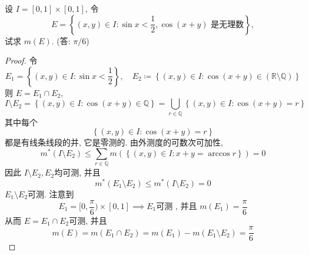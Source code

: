 \documentclass[../main.tex]{subfiles}
\begin{document}
\begin{exercise}{}{}
设 $I=[0,1]\times[0,1]$, 令
\[
E = \left\{ (x,y) \in I: \sin x < \frac{1}{2}, \cos(x+y) \text{ 是无理数} \right\},
\]
试求 $m(E)$. (答: $\pi/6$)

\end{exercise}
\begin{proof}
    令 \[
    E_1= \left\{ \left( x,y \right)\in I: \sin x< \frac{1 }{2 }   \right\} ,\quad E_2\coloneqq \left\{ \left( x,y \right)\in I:\cos \left( x+ y \right)\in \left( \mathbb{R} \setminus \mathbb{Q}  \right)    \right\}
    \]则 \(  E= E_1\cap E_2  \),  \[
    I\setminus E_2= \left\{ \left( x,y \right)\in I : \cos \left( x+ y \right)\in \mathbb{Q}    \right\}= \bigcup _{r \in \mathbb{Q} }\left\{ \left( x,y \right)  \in I:\cos \left( x+ y \right)= r \right\}
    \]其中每个\[
    \left\{ \left( x,y \right)\in I: \cos \left( x+ y \right)= r   \right\}
    \]都是有线条线段的并, 它是零测的. 由外测度的可数次可加性,  \[
    m^{*}\left( I\setminus E_2 \right)\le \sum _{r \in \mathbb{Q} }m\left( \left\{ \left( x,y \right)\in I: x+ y= \arccos r  \right\} \right)= 0  
    \]
     因此 \(  I\setminus E_2, E_2  \)均可测, 并且  \[
     m^{*}\left( E_1\setminus E_2 \right)\le m^{*}\left( I\setminus E_2  \right)= 0  
     \]
     \(  E_1\setminus E_2  \)可测.  注意到 \[
     E_1= [0,\frac{ \pi }{6 } )\times \left[ 0,1 \right]\implies E_1\text{可测 , 并且 }m\left( E_1 \right)= \frac{ \pi }{6 }   
     \] 从而 \(  E= E_1\cap E_2  \)可测, 并且   \[
     m\left( E \right)=  m\left( E_1\cap E_2 \right)= m\left( E_1 \right)-m\left( E_1\setminus E_2 \right)  = \frac{ \pi }{6 }  
     \]
\end{proof}
\end{document}
